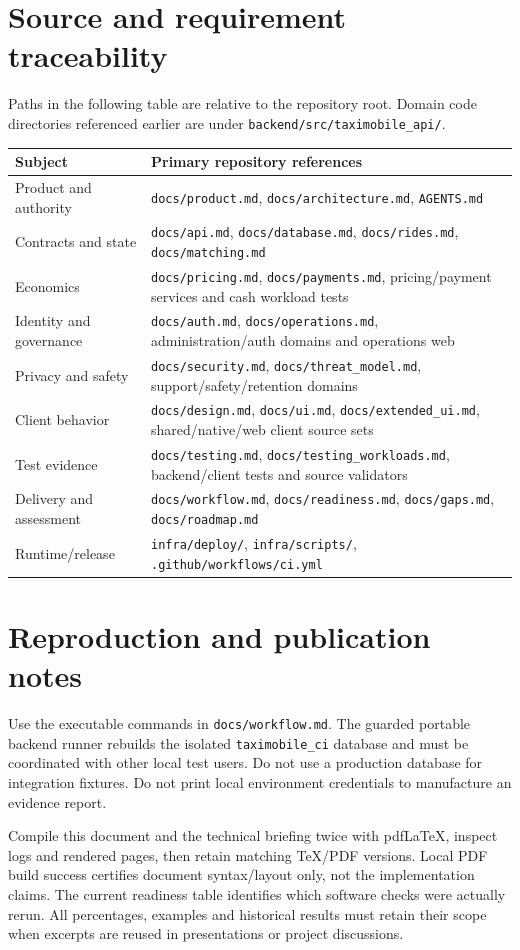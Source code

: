 \documentclass[11pt,a4paper]{article}
\newcommand{\src}[1]{{\small\nolinkurl{#1}}}
\begin{document}
\section{Source and requirement traceability}
Paths in the following table are relative to the repository root. Domain code
directories referenced earlier are under \src{backend/src/taximobile_api/}.
\begin{table}[H]\centering
\begin{tabular}{@{}p{}p{}@{}}
\toprule Subject & Primary repository references \\\midrule
Product and authority & \src{docs/product.md}, \src{docs/architecture.md}, \src{AGENTS.md} \\
Contracts and state & \src{docs/api.md}, \src{docs/database.md}, \src{docs/rides.md}, \src{docs/matching.md} \\
Economics & \src{docs/pricing.md}, \src{docs/payments.md}, pricing/payment services and cash workload tests \\
Identity and governance & \src{docs/auth.md}, \src{docs/operations.md}, administration/auth domains and operations web \\
Privacy and safety & \src{docs/security.md}, \src{docs/threat_model.md}, support/safety/retention domains \\
Client behavior & \src{docs/design.md}, \src{docs/ui.md}, \src{docs/extended_ui.md}, shared/native/web client source sets \\
Test evidence & \src{docs/testing.md}, \src{docs/testing_workloads.md}, backend/client tests and source validators \\
Delivery and assessment & \src{docs/workflow.md}, \src{docs/readiness.md}, \src{docs/gaps.md}, \src{docs/roadmap.md} \\
Runtime/release & \src{infra/deploy/}, \src{infra/scripts/}, \src{.github/workflows/ci.yml} \\
\bottomrule
\end{tabular}
\end{table}

\section{Reproduction and publication notes}
Use the executable commands in \src{docs/workflow.md}. The guarded portable
backend runner rebuilds the isolated \src{taximobile_ci} database and must be
coordinated with other local test users. Do not use a production database for
integration fixtures. Do not print local environment credentials to manufacture
an evidence report.

Compile this document and the technical briefing twice with pdfLaTeX, inspect
logs and rendered pages, then retain matching TeX/PDF versions. Local PDF build
success certifies document syntax/layout only, not the implementation claims.
The current readiness table identifies which software checks were actually
rerun. All percentages, examples and historical results must retain their scope
when excerpts are reused in presentations or project discussions.
\end{document}
